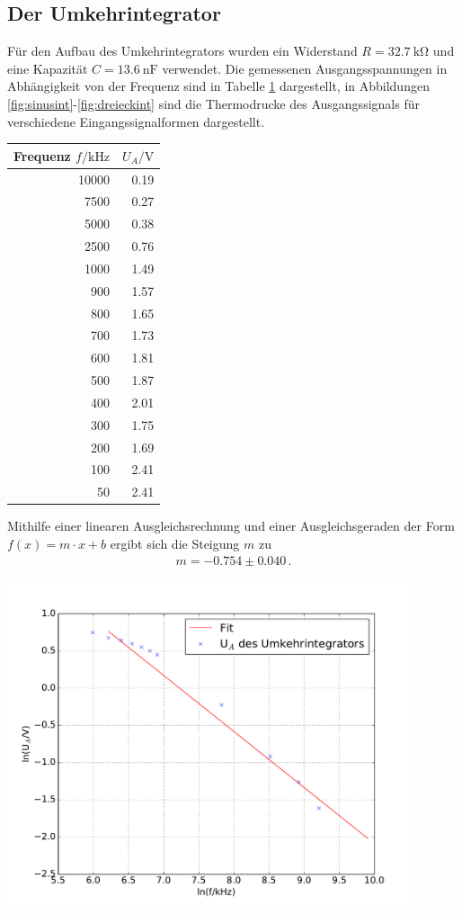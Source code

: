 \documentclass[]{scrartcl}
\begin{document}
\subsection{Der Umkehrintegrator}
Für den Aufbau des Umkehrintegrators wurden ein Widerstand $R=\SI{32.7}{\kilo\ohm}$ und eine Kapazität $C=\SI{13.6}{\nano\farad}$ verwendet. Die gemessenen Ausgangsspannungen in Abhängigkeit von der Frequenz sind in Tabelle \ref{tab:integrator} dargestellt, in Abbildungen \ref{fig:sinusint}-\ref{fig:dreieckint} sind die Thermodrucke des Ausgangssignals für verschiedene Eingangssignalformen dargestellt.
\begin{table}[H]
	\centering
	\label{tab:integrator}
	\hskip-1.50cm
	\begin{tabular}{r r}
		\toprule
			Frequenz $f / \si{\kilo\hertz}$ & $U_A / \si{\volt}$ \\
		\midrule
			10000 & 0.19 \\
			7500  & 0.27 \\
			5000  & 0.38 \\
			2500  & 0.76 \\
			1000  & 1.49 \\
			900   & 1.57 \\
			800   & 1.65 \\
			700   & 1.73 \\
			600   & 1.81 \\
			500   & 1.87 \\
			400   & 2.01 \\
			300   & 1.75 \\
			200   & 1.69 \\
			100   & 2.41 \\
			50    & 2.41 \\
		 \bottomrule
	\end{tabular}
\end{table}
Mithilfe einer linearen Ausgleichsrechnung und einer Ausgleichsgeraden der Form $f(x)=m\cdot x +b$ ergibt sich die Steigung $m$ zu
\begin{align*}
m = -0.754\pm 0.040\,.
\end{align*}
\begin{center}
	\includegraphics[width=12cm]{images/integrator.pdf}
	\label{fig:integrator}
\end{center}
\end{document}

